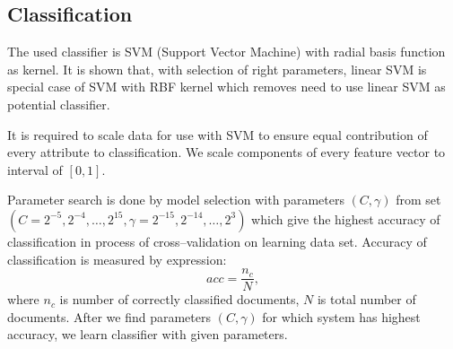 \documentclass[11pt,english]{article}
\begin{document}
\begin{multicols}{2}
\section{Classification}

The used classifier is SVM (Support Vector Machine) with radial basis
function as kernel. It is shown that, with selection of right parameters, linear
SVM is special case of SVM with RBF kernel \citep{keerthi2003asymptotic} which
removes need to use linear SVM as potential classifier.

It is required to scale data for use with SVM to ensure equal contribution of
every attribute to classification. We scale components of every feature vector
to interval of $[0, 1]$.

Parameter search is done by model selection with parameters $(C, \gamma)$ from
set $\left (C = {2^{-5}, 2^{-4}, \ldots , 2^{15}},  \gamma = {2^{-15}, 2^{-14},
\ldots, 2^3} \right )$ \citep{CC01a} which give the highest accuracy of
classification in process of cross--validation on learning data set. Accuracy
of classification is measured by expression:
\begin{equation}
acc = \frac{n_c}{N}, %
\end{equation}
where $n_c$ is number of correctly classified documents, $N$ is total number of
documents. After we find parameters $(C, \gamma)$ for which system has highest
accuracy, we learn classifier with given parameters.



\end{multicols}
\end{document}
